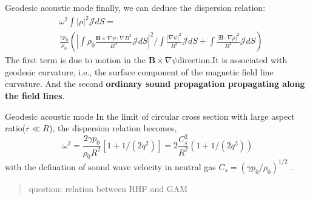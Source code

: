 \documentclass{beamer}
\begin{document}
\begin{frame}{Geodesic acoustic mode}
finally, we can deduce the dispersion relation:
\begin{equation}
\begin{aligned}
& \omega^2\int{|\rho|^2}\mathcal{J}dS= \\ 
& \frac{\gamma{p_0}}{\rho_0}( |\int\rho_0\frac{\pmb{B}\times\nabla\psi\cdot\nabla{B^2}}{B^4}\mathcal{J}dS|^2/\int\frac{|\nabla\psi|^2}{B^2}\mathcal{J}dS + \int\frac{|\pmb{B}\cdot\nabla\rho|^2}{B^2}\mathcal{J}dS )
\end{aligned}
\end{equation}
The first term is due to motion in the $\pmb{B}\times\nabla\psi$direction.It is associated with geodesic curvature, i.e., the surface component of the magnetic field line curvature. And the second \textbf{ordinary sound propagation propagating along the field lines}.
\end{frame}


\begin{frame}{Geodesic acoustic mode}
In the limit of circular cross section with large aspect ratio($r\ll R$), the dispersion relation becomes,
\begin{equation}
\omega^2=\frac{2\gamma{p_0}}{\rho_0{R}^2}[1+1/(2q^2)]=2\frac{C_s^2}{R^2}(1+1/(2q^2))
\end{equation}
with the defination of sound wave velocity in neutral gas $C_s=(\gamma{p_0}/\rho_0)^{1/2}$ .

\begin{quote}
{\color{magenta} question: relation between RHF and GAM}
\end{quote}

\end{frame}
\end{document}
